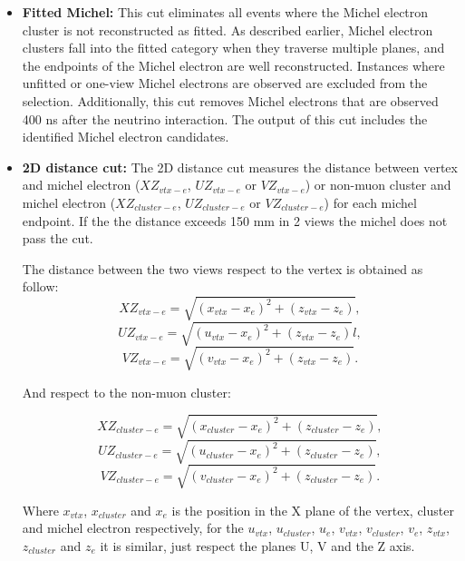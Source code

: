 \begin{itemize}
    \item \textbf{Fitted Michel:} This cut eliminates all events where the Michel electron cluster is not reconstructed as fitted. As described earlier, Michel electron clusters fall into the fitted category when they traverse multiple planes, and the endpoints of the Michel electron are well reconstructed. Instances where unfitted or one-view Michel electrons are observed are excluded from the selection. Additionally, this cut removes Michel electrons that are observed 400 ns after the neutrino interaction. The output of this cut includes the identified Michel electron candidates.

    \item \textbf{2D distance cut:} The 2D distance cut measures the distance between vertex and michel electron ($XZ_{vtx-e}$, $UZ_{vtx-e}$ or $VZ_{vtx-e}$) or non-muon cluster  and michel electron ($XZ_{cluster-e}$, $UZ_{cluster-e}$ or $VZ_{cluster-e}$) for each michel endpoint. If the the distance exceeds 150 mm in 2 views the michel does not pass the cut. 
    
    The distance between the two views respect to the vertex is obtained as follow:
    \begin{equation}
        XZ_{vtx-e} = \sqrt{(x_{vtx}-x_e)^2 + (z_{vtx}-z_e)},
    \end{equation}
        \begin{equation}
        UZ_{vtx-e} = \sqrt{(u_{vtx}-x_e)^2 + (z_{vtx}-z_e)}l,
    \end{equation}
        \begin{equation}
        VZ_{vtx-e} = \sqrt{(v_{vtx}-x_e)^2 + (z_{vtx}-z_e)}.
    \end{equation}

    And respect to the non-muon cluster:

    \begin{equation}
        XZ_{cluster-e} = \sqrt{(x_{cluster}-x_e)^2 + (z_{cluster}-z_e)},
    \end{equation}
        \begin{equation}
        UZ_{cluster-e} = \sqrt{(u_{cluster}-x_e)^2 + (z_{cluster}-z_e)},
    \end{equation}
        \begin{equation}
        VZ_{cluster-e} = \sqrt{(v_{cluster}-x_e)^2 + (z_{cluster}-z_e)}.
    \end{equation}

    Where $x_{vtx}$, $x_{cluster}$ and $x_{e}$ is the position in the X plane of the vertex, cluster and michel electron respectively, for the $u_{vtx}$, $u_{cluster}$, $u_{e}$, $v_{vtx}$, $v_{cluster}$, $v_{e}$, $z_{vtx}$, $z_{cluster}$ and $z_{e}$ it is similar, just respect the planes U, V and the Z axis.


\end{itemize}
